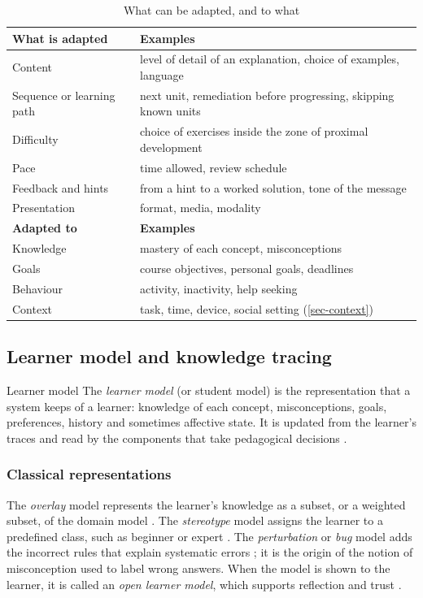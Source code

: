\begin{table}[htbp]
\centering
\caption{What can be adapted, and to what}
\label{tab-adapt-what}
\small
\begin{tabularx}{\textwidth}{@{}L{3.6cm}Y@{}}
\toprule
\textbf{What is adapted} & \textbf{Examples} \\
\midrule
Content & level of detail of an explanation, choice of examples, language \\
Sequence or learning path & next unit, remediation before progressing, skipping known units \\
Difficulty & choice of exercises inside the zone of proximal development \\
Pace & time allowed, review schedule \\
Feedback and hints & from a hint to a worked solution, tone of the message \\
Presentation & format, media, modality \\
\midrule
\textbf{Adapted to} & \textbf{Examples} \\
\midrule
Knowledge & mastery of each concept, misconceptions \\
Goals & course objectives, personal goals, deadlines \\
Behaviour & activity, inactivity, help seeking \\
Context & task, time, device, social setting (\cref{sec-context}) \\
\bottomrule
\end{tabularx}
\end{table}

\subsection{Learner model and knowledge tracing}
\label{sec-kt}

\begin{definitionbox}{Learner model}
The \emph{learner model} (or student model) is the representation that a
system keeps of a learner: knowledge of each concept, misconceptions,
goals, preferences, history and sometimes affective state. It is updated
from the learner's traces and read by the components that take
pedagogical decisions \cite{brusilovsky2007,chrysafiadi2013}.
\end{definitionbox}

\subsubsection{Classical representations}
The \emph{overlay} model represents
the learner's knowledge as a subset, or a weighted subset, of the domain
model \cite{carr1977}. The \emph{stereotype} model assigns the learner to a
predefined class, such as beginner or expert \cite{rich1979}. The
\emph{perturbation} or \emph{bug} model adds the incorrect rules that
explain systematic errors \cite{brown1978}; it is the origin of the notion
of misconception used to label wrong answers. When the model is shown to
the learner, it is called an \emph{open learner model}, which supports
reflection and trust \cite{bull2016}.

